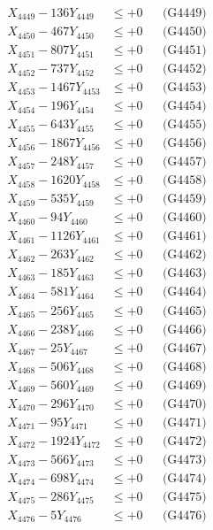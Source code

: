 \documentclass[a4paper,10pt]{article}
\begin{document}
{\begin{align}
X_{4449} - 136Y_{4449} &\leq +0 && \text{(G4449)} \\
X_{4450} - 467Y_{4450} &\leq +0 && \text{(G4450)} \\
\allowbreak
X_{4451} - 807Y_{4451} &\leq +0 && \text{(G4451)} \\
X_{4452} - 737Y_{4452} &\leq +0 && \text{(G4452)} \\
X_{4453} - 1467Y_{4453} &\leq +0 && \text{(G4453)} \\
X_{4454} - 196Y_{4454} &\leq +0 && \text{(G4454)} \\
X_{4455} - 643Y_{4455} &\leq +0 && \text{(G4455)} \\
X_{4456} - 1867Y_{4456} &\leq +0 && \text{(G4456)} \\
X_{4457} - 248Y_{4457} &\leq +0 && \text{(G4457)} \\
X_{4458} - 1620Y_{4458} &\leq +0 && \text{(G4458)} \\
X_{4459} - 535Y_{4459} &\leq +0 && \text{(G4459)} \\
X_{4460} - 94Y_{4460} &\leq +0 && \text{(G4460)} \\
\allowbreak
X_{4461} - 1126Y_{4461} &\leq +0 && \text{(G4461)} \\
X_{4462} - 263Y_{4462} &\leq +0 && \text{(G4462)} \\
X_{4463} - 185Y_{4463} &\leq +0 && \text{(G4463)} \\
X_{4464} - 581Y_{4464} &\leq +0 && \text{(G4464)} \\
X_{4465} - 256Y_{4465} &\leq +0 && \text{(G4465)} \\
X_{4466} - 238Y_{4466} &\leq +0 && \text{(G4466)} \\
X_{4467} - 25Y_{4467} &\leq +0 && \text{(G4467)} \\
X_{4468} - 506Y_{4468} &\leq +0 && \text{(G4468)} \\
X_{4469} - 560Y_{4469} &\leq +0 && \text{(G4469)} \\
X_{4470} - 296Y_{4470} &\leq +0 && \text{(G4470)} \\
\allowbreak
X_{4471} - 95Y_{4471} &\leq +0 && \text{(G4471)} \\
X_{4472} - 1924Y_{4472} &\leq +0 && \text{(G4472)} \\
X_{4473} - 566Y_{4473} &\leq +0 && \text{(G4473)} \\
X_{4474} - 698Y_{4474} &\leq +0 && \text{(G4474)} \\
X_{4475} - 286Y_{4475} &\leq +0 && \text{(G4475)} \\
X_{4476} - 5Y_{4476} &\leq +0 && \text{(G4476)} \\

\end{align}}
\end{document}
